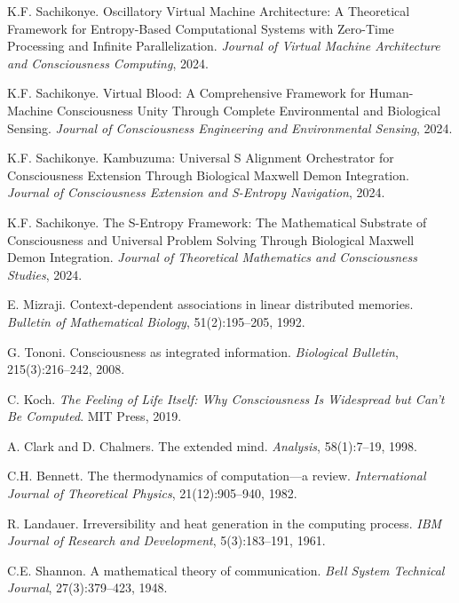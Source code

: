\documentclass[12pt,a4paper]{article}
\begin{document}

\begin{thebibliography}{99}

K.F. Sachikonye.
Oscillatory Virtual Machine Architecture: A Theoretical Framework for Entropy-Based Computational Systems with Zero-Time Processing and Infinite Parallelization.
\textit{Journal of Virtual Machine Architecture and Consciousness Computing}, 2024.

K.F. Sachikonye.
Virtual Blood: A Comprehensive Framework for Human-Machine Consciousness Unity Through Complete Environmental and Biological Sensing.
\textit{Journal of Consciousness Engineering and Environmental Sensing}, 2024.

K.F. Sachikonye.
Kambuzuma: Universal S Alignment Orchestrator for Consciousness Extension Through Biological Maxwell Demon Integration.
\textit{Journal of Consciousness Extension and S-Entropy Navigation}, 2024.

K.F. Sachikonye.
The S-Entropy Framework: The Mathematical Substrate of Consciousness and Universal Problem Solving Through Biological Maxwell Demon Integration.
\textit{Journal of Theoretical Mathematics and Consciousness Studies}, 2024.

E. Mizraji.
Context-dependent associations in linear distributed memories.
\textit{Bulletin of Mathematical Biology}, 51(2):195--205, 1992.

G. Tononi.
Consciousness as integrated information.
\textit{Biological Bulletin}, 215(3):216--242, 2008.

C. Koch.
\textit{The Feeling of Life Itself: Why Consciousness Is Widespread but Can't Be Computed}.
MIT Press, 2019.

A. Clark and D. Chalmers.
The extended mind.
\textit{Analysis}, 58(1):7--19, 1998.

C.H. Bennett.
The thermodynamics of computation—a review.
\textit{International Journal of Theoretical Physics}, 21(12):905--940, 1982.

R. Landauer.
Irreversibility and heat generation in the computing process.
\textit{IBM Journal of Research and Development}, 5(3):183--191, 1961.

C.E. Shannon.
A mathematical theory of communication.
\textit{Bell System Technical Journal}, 27(3):379--423, 1948.


\end{thebibliography}
\end{document}
